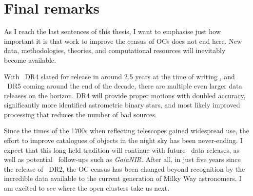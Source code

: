 \section{Final remarks}

As I reach the last sentences of this thesis, I want to emphasise just how important it is that work to improve the census of OCs does not end here. New data, methodologies, theories, and computational resources will inevitably become available. 

With \gaia\ DR4 slated for release in around 2.5 years at the time of writing \citep[no sooner than the end of 2025,][]{gaia_collaboration_gaia_2022}, and \gaia\ DR5 coming around the end of the decade, there are multiple even larger data releases on the horizon. DR4 will provide proper motions with doubled accuracy, significantly more identified astrometric binary stars, and most likely improved processing that reduces the number of bad sources.

Since the times of the 1700s when reflecting telescopes gained widespread use, the effort to improve catalogues of objects in the night sky has been never-ending. I expect that this long-held tradition will continue with future \gaia\ data releases, as well as potential \gaia\ follow-ups such as \emph{GaiaNIR}. After all, in just five years since the release of \gaia\ DR2, the OC census has been changed beyond recognition by the incredible data available to the current generation of Milky Way astronomers. I am excited to see where the open clusters take us next.







